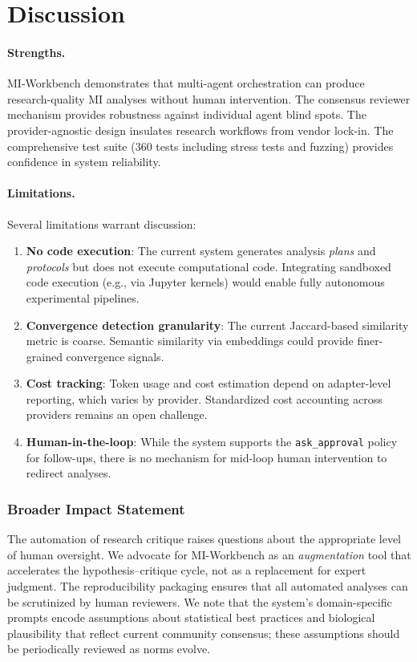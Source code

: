 \documentclass[10pt]{article}
\begin{document}
\section{Discussion}
\label{sec:discussion}

\paragraph{Strengths.}
MI-Workbench demonstrates that multi-agent orchestration can produce research-quality MI analyses without human intervention. The consensus reviewer mechanism provides robustness against individual agent blind spots. The provider-agnostic design insulates research workflows from vendor lock-in. The comprehensive test suite (360 tests including stress tests and fuzzing) provides confidence in system reliability.

\paragraph{Limitations.}
Several limitations warrant discussion:
\begin{enumerate}
  \item \textbf{No code execution}: The current system generates analysis \emph{plans} and \emph{protocols} but does not execute computational code. Integrating sandboxed code execution (e.g., via Jupyter kernels) would enable fully autonomous experimental pipelines.
  \item \textbf{Convergence detection granularity}: The current Jaccard-based similarity metric is coarse. Semantic similarity via embeddings could provide finer-grained convergence signals.
  \item \textbf{Cost tracking}: Token usage and cost estimation depend on adapter-level reporting, which varies by provider. Standardized cost accounting across providers remains an open challenge.
  \item \textbf{Human-in-the-loop}: While the system supports the \texttt{ask\_approval} policy for follow-ups, there is no mechanism for mid-loop human intervention to redirect analyses.
\end{enumerate}

\subsubsection*{Broader Impact Statement}
The automation of research critique raises questions about the appropriate level of human oversight. We advocate for MI-Workbench as an \emph{augmentation} tool that accelerates the hypothesis--critique cycle, not as a replacement for expert judgment. The reproducibility packaging ensures that all automated analyses can be scrutinized by human reviewers. We note that the system's domain-specific prompts encode assumptions about statistical best practices and biological plausibility that reflect current community consensus; these assumptions should be periodically reviewed as norms evolve.
\end{document}

